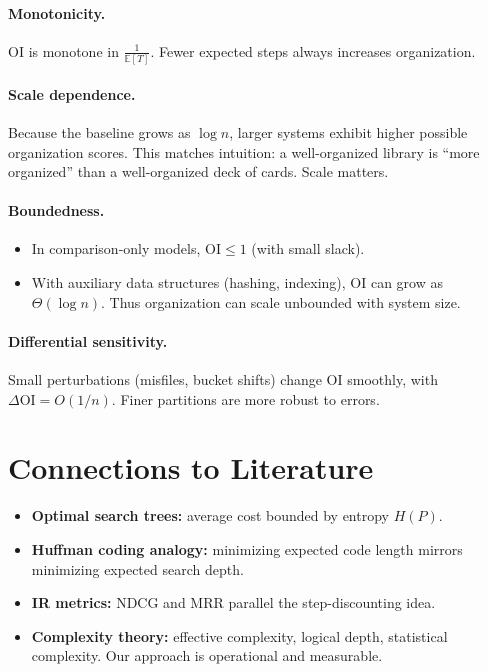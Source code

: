\documentclass[11pt]{article}
\begin{document}
\paragraph{Monotonicity.}
$\mathrm{OI}$ is monotone in $\tfrac{1}{\mathbb{E}[T]}$. Fewer expected steps
always increases organization.

\paragraph{Scale dependence.}
Because the baseline grows as $\log n$, larger systems exhibit higher possible
organization scores. This matches intuition: a well-organized library is
``more organized'' than a well-organized deck of cards. Scale matters.

\paragraph{Boundedness.}
\begin{itemize}
  \item In comparison-only models, $\mathrm{OI}\leq 1$ (with small slack).
  \item With auxiliary data structures (hashing, indexing), $\mathrm{OI}$ can
  grow as $\Theta(\log n)$. Thus organization can scale unbounded with system
  size.
\end{itemize}

\paragraph{Differential sensitivity.}
Small perturbations (misfiles, bucket shifts) change $\mathrm{OI}$ smoothly,
with $\Delta \mathrm{OI}=O(1/n)$. Finer partitions are more robust to errors.

\section{Connections to Literature}
\begin{itemize}
  \item \textbf{Optimal search trees:} average cost bounded by entropy $H(P)$.
  \item \textbf{Huffman coding analogy:} minimizing expected code length mirrors
  minimizing expected search depth.
  \item \textbf{IR metrics:} NDCG and MRR parallel the step-discounting idea.
  \item \textbf{Complexity theory:} effective complexity, logical depth,
  statistical complexity. Our approach is operational and measurable.
\end{itemize}
\end{document}
